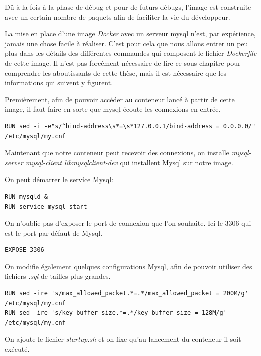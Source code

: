 Dû à la fois à la phase de débug et pour de futurs débugs, l'image est construite avec un certain nombre de paquets afin de faciliter la vie du développeur.

La mise en place d'une image \emph{Docker} avec un serveur mysql n'est, par expérience, jamais une chose facile à réaliser. C'est pour cela que nous allons entrer un peu plus dans les détails des différentes commandes qui composent le fichier \emph{Dockerfile} de cette image. Il n'est pas forcément nécessaire de lire ce sous-chapitre pour comprendre les aboutissants de cette thèse, mais il est nécessaire que les informations qui suivent y figurent.

\newpage
Premièrement, afin de pouvoir accéder au conteneur lancé à partir de cette image, il faut faire en sorte que mysql écoute les connexions en entrée.

\lstset{language=bash}

\begin{lstlisting}[frame=single]
RUN sed -i -e"s/^bind-address\s*=\s*127.0.0.1/bind-address = 0.0.0.0/" /etc/mysql/my.cnf
\end{lstlisting}

Maintenant que notre conteneur peut recevoir des connexions, on installe \emph{mysql-server mysql-client libmysqlclient-dev} qui installent Mysql sur notre image.

On peut démarrer le service Mysql:

\begin{lstlisting}[frame=single]
RUN mysqld &
RUN service mysql start
\end{lstlisting}

On n’oublie pas d'exposer le port de connexion que l'on souhaite. Ici le 3306 qui est le port par défaut de Mysql.

\begin{lstlisting}[frame=single]
EXPOSE 3306
\end{lstlisting}

On modifie également quelques configurations Mysql, afin de pouvoir utiliser des fichiers \emph{.sql} de tailles plus grandes.

\begin{lstlisting}[frame=single]
RUN sed -ire 's/max_allowed_packet.*=.*/max_allowed_packet = 200M/g' /etc/mysql/my.cnf
RUN sed -ire 's/key_buffer_size.*=.*/key_buffer_size = 128M/g' /etc/mysql/my.cnf
\end{lstlisting}

On ajoute le fichier \emph{startup.sh} et on fixe qu'au lancement du conteneur il soit exécuté.

